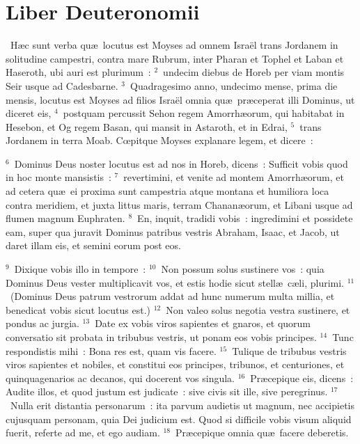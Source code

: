 \clearpage
{\centering \section*{Liber Deuteronomii}}\thispagestyle{empty}

~H\ae c sunt verba qu\ae\ locutus est Moyses ad omnem Isra\"el trans Jordanem in solitudine campestri, contra mare Rubrum, inter Pharan et Tophel et Laban et Haseroth, ubi auri est plurimum~:
${}^{2}$~undecim diebus de Horeb per viam montis Seir usque ad Cadesbarne.
${}^{3}$~Quadragesimo anno, undecimo mense, prima die mensis, locutus est Moyses ad filios Isra\"el omnia qu\ae\ pr\ae ceperat illi Dominus, ut diceret eis,
${}^{4}$~postquam percussit Sehon regem Amorrh\ae orum, qui habitabat in Hesebon, et Og regem Basan, qui mansit in Astaroth, et in Edrai,
${}^{5}$~trans Jordanem in terra Moab. Cœpitque Moyses explanare legem, et dicere~:


${}^{6}$~Dominus Deus noster locutus est ad nos in Horeb, dicens~: Sufficit vobis quod in hoc monte mansistis~:
${}^{7}$~revertimini, et venite ad montem Amorrh\ae orum, et ad cetera qu\ae\ ei proxima sunt campestria atque montana et humiliora loca contra meridiem, et juxta littus maris, terram Chanan\ae orum, et Libani usque ad flumen magnum Euphraten.
${}^{8}$~En, inquit, tradidi vobis~: ingredimini et possidete eam, super qua juravit Dominus patribus vestris Abraham, Isaac, et Jacob, ut daret illam eis, et semini eorum post eos.


${}^{9}$~Dixique vobis illo in tempore~:
${}^{10}$~Non possum solus sustinere vos~: quia Dominus Deus vester multiplicavit vos, et estis hodie sicut stell\ae\ c\ae li, plurimi.
${}^{11}$~(Dominus Deus patrum vestrorum addat ad hunc numerum multa millia, et benedicat vobis sicut locutus est.)
${}^{12}$~Non valeo solus negotia vestra sustinere, et pondus ac jurgia.
${}^{13}$~Date ex vobis viros sapientes et gnaros, et quorum conversatio sit probata in tribubus vestris, ut ponam eos vobis principes.
${}^{14}$~Tunc respondistis mihi~: Bona res est, quam vis facere.
${}^{15}$~Tulique de tribubus vestris viros sapientes et nobiles, et constitui eos principes, tribunos, et centuriones, et quinquagenarios ac decanos, qui docerent vos singula.
${}^{16}$~Pr\ae cepique eis, dicens~: Audite illos, et quod justum est judicate~: sive civis sit ille, sive peregrinus.
${}^{17}$~Nulla erit distantia personarum~: ita parvum audietis ut magnum, nec accipietis cujusquam personam, quia Dei judicium est. Quod si difficile vobis visum aliquid fuerit, referte ad me, et ego audiam.
${}^{18}$~Pr\ae cepique omnia qu\ae\ facere deberetis.


